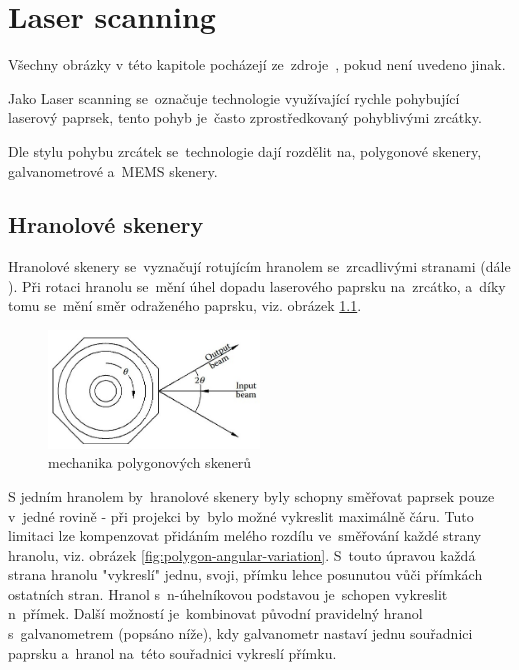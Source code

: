 \chapter{Laser scanning~\cite{scanning-handbook}}
Všechny obrázky v této kapitole pocházejí ze~zdroje~\cite{scanning-handbook}, pokud není uvedeno jinak.

Jako Laser scanning se~označuje technologie využívající rychle pohybující laserový paprsek, tento pohyb je~často zprostředkovaný pohyblivými zrcátky.

Dle stylu pohybu zrcátek se~technologie dají rozdělit na, polygonové skenery, galvanometrové a~MEMS skenery.

\section{Hranolové skenery}
Hranolové skenery se~vyznačují rotujícím hranolem se~zrcadlivými stranami (dále ). Při rotaci hranolu se~mění úhel dopadu laserového paprsku na~zrcátko, a~díky tomu se~mění směr odraženého paprsku, viz. obrázek \ref{fig:polygon-scanner}. 

\begin{figure}[H]
  \centering
  \includegraphics[width=0.5\textwidth]{img/polygon-scanner.jpg}
  \caption{\label{fig:polygon-scanner} mechanika polygonových skenerů}
\end{figure}


%

S jedním hranolem by~hranolové skenery byly schopny směřovat paprsek pouze v~jedné rovině - při projekci by~bylo možné vykreslit maximálně čáru. Tuto limitaci lze kompenzovat přidáním melého rozdílu ve~směřování každé strany hranolu, viz. obrázek \ref{fig:polygon-angular-variation}. S~touto úpravou každá strana hranolu "vykreslí" jednu, svoji, přímku lehce posunutou vůči přímkách ostatních stran. Hranol s~n-úhelníkovou podstavou je~schopen vykreslit n~přímek.
Další možností je~kombinovat původní pravidelný hranol s~galvanometrem (popsáno níže), kdy galvanometr nastaví jednu souřadnici paprsku a~hranol na~této souřadnici vykreslí přímku.

